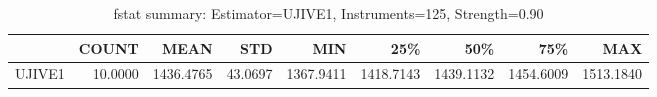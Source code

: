 \begin{table}[ht]
\centering
\caption{fstat summary: Estimator=UJIVE1, Instruments=125, Strength=0.90}
\begin{tabular}{lrrrrrrrr}
\toprule
 & COUNT & MEAN & STD & MIN & 25\% & 50\% & 75\% & MAX \\
\midrule
UJIVE1 & 10.0000 & 1436.4765 & 43.0697 & 1367.9411 & 1418.7143 & 1439.1132 & 1454.6009 & 1513.1840 \\
\bottomrule
\end{tabular}
\end{table}
